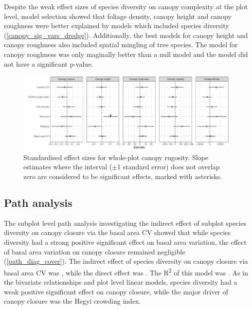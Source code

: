\documentclass[11pt,a4paper]{article}
\begin{document}
Despite the weak effect sizes of species diversity on canopy complexity at the plot level, model selection showed that foliage density, canopy height and canopy roughness were better explained by models which included species diversity (\autoref{canopy_sig_vars_dredge}). Additionally, the best models for canopy height and canopy roughness also included spatial mingling of tree species. The model for canopy roughness was only maginally better than a null model and the model did not have a significant p-value.

\begin{figure}
	\includegraphics[width=\linewidth]{canopy_rough_slopes}
	\caption{Standardised effect sizes for whole-plot canopy rugosity. Slope estimates where the interval ($\pm$1 standard error) does not overlap zero are considered to be significant effects, marked with asterisks.}
	\label{canopy_rough_slopes}
\end{figure}



\subsection{Path analysis}

The subplot level path analysis investigating the indirect effect of subplot species diversity on canopy closure via the basal area CV showed that while species diversity had a strong positive significant effect on basal area variation, the effect of basal area variation on canopy closure remained negligible (\autoref{path_diag_cover}). The indirect effect of species diversity on canopy closure via basal area CV was \shannonBaCoverPath{}, while the direct effect was \shannonCoverPath{}. The R\textsuperscript{2} of this model was \coverSemRm{}. As in the bivariate relationships and plot level linear models, species diversity had a weak positive significant effect on canopy closure, while the major driver of canopy closure was the Hegyi crowding index. 
\end{document}

